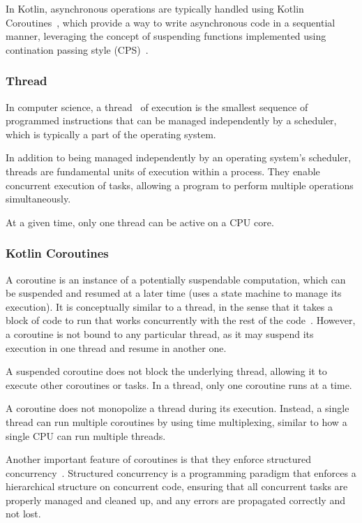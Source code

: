 In Kotlin, asynchronous operations are typically handled using Kotlin Coroutines~\cite{kotlin-coroutines},
which provide a way to write asynchronous code in a sequential manner,
leveraging the concept of suspending functions implemented using contination passing style (CPS)~\cite{continuation-passing-style}.

\subsubsection{Thread}\label{subsubsec:thread}

In computer science, a thread~\cite{java-thread} of execution is the smallest sequence of programmed instructions that can be managed independently by a scheduler, which is typically a part of the operating system.

In addition to being managed independently by an operating system's scheduler, threads are fundamental units of execution within a process.
They enable concurrent execution of tasks, allowing a program to perform multiple operations simultaneously.

At a given time, only one thread can be active on a CPU core.

\subsubsection{Kotlin Coroutines}\label{subsubsec:kotlin-coroutines}

A coroutine is an instance of a potentially suspendable computation,
which can be suspended and resumed at a later time (uses a state machine to manage its execution).
It is conceptually similar to a thread,
in the sense that it takes a block of code
to run that works concurrently with the rest of the code~\cite{kotlin-coroutines}.
However, a coroutine is not bound to any particular thread,
as it may suspend its execution in one thread and resume in another one.

A suspended coroutine does not block the underlying thread, allowing it to execute other coroutines or tasks.
In a thread, only one coroutine runs at a time.

A coroutine does not monopolize a thread during its execution.
Instead, a single thread can run multiple coroutines by using time multiplexing,
similar to how a single CPU can run multiple threads.

Another important feature of coroutines is that they enforce structured concurrency~\cite{kotlin-coroutines}.
Structured concurrency is a programming paradigm that enforces a hierarchical structure on concurrent code, ensuring that all concurrent tasks are properly managed and cleaned up, and any errors are propagated correctly and not lost.

